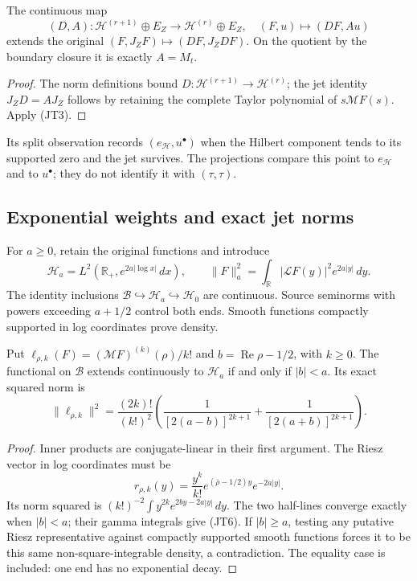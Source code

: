 \begin{corollary}
The continuous map
\[
 (D,A):\mathscr H^{(r+1)}\oplus E_Z\longrightarrow
           \mathscr H^{(r)}\oplus E_Z,\quad(F,u)\mapsto(DF,Au)
 \tag{JT4}
\]
extends the original \((F,J_ZF)\mapsto(DF,J_ZDF)\).
On the quotient by the boundary closure it is exactly \(A=M_t\).
\end{corollary}
\begin{proof}
The norm definitions bound \(D:\mathscr H^{(r+1)}\to\mathscr H^{(r)}\);
the jet identity \(J_ZD=AJ_Z\) follows by retaining the complete
Taylor polynomial of \(s\mathcal MF(s)\). Apply (JT3).
\end{proof}
Its split observation records \((e_{\mathscr H},u^\bullet)\) when the
Hilbert component tends to its supported zero and the jet survives.
The projections compare this point to \(e_{\mathscr H}\) and to
\(u^\bullet\); they do not identify it with \((\tau,\tau)\).

\subsection{Exponential weights and exact jet norms}
For \(a\geq0\), retain the original functions and introduce
\[
 \mathscr H_a=L^2(\mathbb R_+,e^{2a|\log x|}\,dx),\qquad
 \|F\|_a^2=\int_{\mathbb R}|\mathcal LF(y)|^2e^{2a|y|}\,dy.
 \tag{JT5}
\]
The identity inclusions \(\mathscr B\hookrightarrow\mathscr H_a
\hookrightarrow\mathscr H_0\) are continuous. Source seminorms
with powers exceeding \(a+1/2\) control both ends. Smooth functions
compactly supported in log coordinates prove density.

\begin{theorem}
\label{thm:weighted-jet}
Put \(\ell_{\rho,k}(F)=(\mathcal MF)^{(k)}(\rho)/k!\) and
\(b=\operatorname{Re}\rho-1/2\), with \(k\geq0\).
The functional on \(\mathscr B\) extends continuously to \(\mathscr H_a\)
if and only if \(|b|<a\). Its exact squared norm is
\[
 \|\ell_{\rho,k}\|^2
 =\frac{(2k)!}{(k!)^2}
 \left(\frac1{[2(a-b)]^{2k+1}}+\frac1{[2(a+b)]^{2k+1}}\right).
 \tag{JT6}
\]
\end{theorem}
\begin{proof}
Inner products are conjugate-linear in their first argument.
The Riesz vector in log coordinates must be
\[
 r_{\rho,k}(y)=\frac{y^k}{k!}
      e^{(\overline\rho-1/2)y}e^{-2a|y|}.
\]
Its norm squared is \((k!)^{-2}\int y^{2k}e^{2by-2a|y|}\,dy\).
The two half-lines converge exactly when \(|b|<a\);
their gamma integrals give (JT6).
If \(|b|\geq a\), testing any putative Riesz representative against
compactly supported smooth functions forces it to be this same
non-square-integrable density, a contradiction.
The equality case is included: one end has no exponential decay.
\end{proof}

